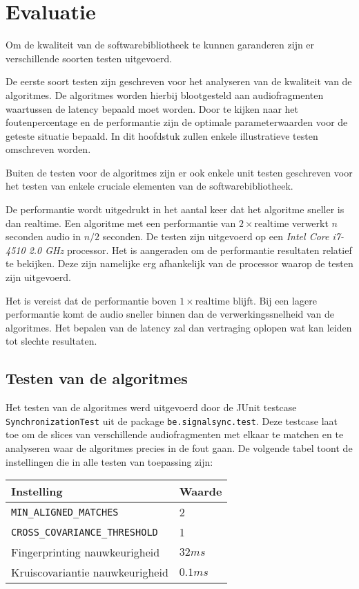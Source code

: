 \chapter{Evaluatie}
\label{evaluatie}

Om de kwaliteit van de softwarebibliotheek te kunnen garanderen zijn er verschillende soorten testen uitgevoerd. 

De eerste soort testen zijn geschreven voor het analyseren van de kwaliteit van de algoritmes. De algoritmes worden hierbij blootgesteld aan audiofragmenten waartussen de latency bepaald moet worden. Door te kijken naar het foutenpercentage en de performantie zijn de optimale parameterwaarden voor de geteste situatie bepaald. In dit hoofdstuk zullen enkele illustratieve testen omschreven worden.

Buiten de testen voor de algoritmes zijn er ook enkele unit testen geschreven voor het testen van enkele cruciale elementen van de softwarebibliotheek.

De performantie wordt uitgedrukt in het aantal keer dat het algoritme sneller is dan realtime. Een algoritme met een performantie van $ 2 \times \textrm{realtime} $ verwerkt $ n $ seconden audio in $ n/2 $ seconden. De testen zijn uitgevoerd op een \textit{Intel Core i7-4510 2.0 GHz} processor. Het is aangeraden om de performantie resultaten relatief te bekijken. Deze zijn namelijke erg afhankelijk van de processor waarop de testen zijn uitgevoerd.

Het is vereist dat de performantie boven $ 1 \times \textrm{realtime} $ blijft. Bij een lagere performantie komt de audio sneller binnen dan de verwerkingssnelheid van de algoritmes. Het bepalen van de latency zal dan vertraging oplopen wat kan leiden tot slechte resultaten.



\section{Testen van de algoritmes}
\label{algoritme-test}

Het testen van de algoritmes werd uitgevoerd door de JUnit testcase \texttt{SynchronizationTest} uit de package \texttt{be.signalsync.test}. Deze testcase laat toe om de slices van verschillende audiofragmenten met elkaar te matchen en te analyseren waar de algoritmes precies in de fout gaan. De volgende tabel toont de instellingen die in alle testen van toepassing zijn:

\begin{tabular}{ l  l}
	\hline
	\textbf{Instelling} & \textbf{Waarde} \\
	\hline
	\texttt{MIN\_ALIGNED\_MATCHES} & 2 \\
	\texttt{CROSS\_COVARIANCE\_THRESHOLD} & 1 \\
	Fingerprinting nauwkeurigheid & $32ms$ \\
	Kruiscovariantie nauwkeurigheid & $0.1ms$
\end{tabular}


